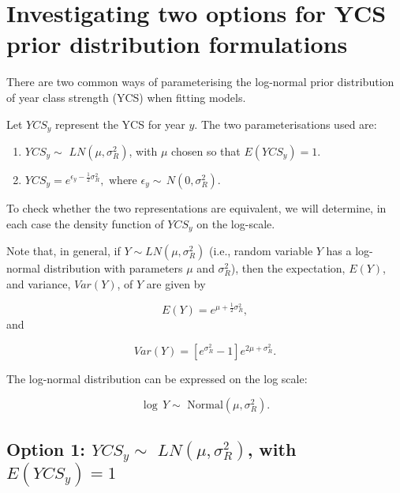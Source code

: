 \begin{appendices}\label{appendix}

\section{Investigating two options for YCS prior distribution
	formulations}\label{investigating-two-options-for-ycs-prior-distribution-formulations}

There are two common ways of parameterising the log-normal prior
distribution of year class strength (YCS) when fitting models.

Let \(YCS_y\) represent the YCS for year \(y\). The two
parameterisations used are:

\begin{enumerate}
	\def\labelenumi{\arabic{enumi}.}
	\item \(YCS_y \sim \,\, LN(\mu, \sigma^2_R)\), with \(\mu\) chosen
	so that \(E(YCS_y)=1\).
	\item \(YCS_y = e^{\epsilon_y - \frac{1}{2}\sigma^2_R},\,\, \text{where } \epsilon_y \sim \,N(0, \sigma^2_R)\).
\end{enumerate}

To check whether the two representations are equivalent, we will
determine, in each case the density function of \(YCS_y\) on the
log-scale.

Note that, in general, if \(Y \sim LN(\mu, \sigma^2_R)\) (i.e., random
variable \(Y\) has a log-normal distribution with parameters \(\mu\)
and \(\sigma^2_R\)), then the expectation, \(E(Y)\), and variance,
\(Var(Y)\), of \(Y\) are given by

\[E(Y) = e^{\mu + \frac{1}{2}\sigma^2_R},\] and

\[Var(Y) = \left[e^{\sigma^2_R}-1\right]e^{2\mu + \sigma^2_R}.\]

The log-normal distribution can be expressed on the log scale:

\[\log\, Y \sim \,\, \text{Normal}(\mu, \sigma^2_R).\]

\subsection*{\texorpdfstring{Option 1:
		\(YCS_y \sim \,\, LN(\mu, \sigma^2_R)\), with
		\(E(YCS_y)=1\)}{1.1 Option 1: YCS\_y \textbackslash{}sim \textbackslash{},\textbackslash{}, LN(\textbackslash{}mu, \textbackslash{}sigma\^{}2\_R), with E(YCS\_y)=1}}\label{option-1-ycs_y-sim-lnmu-sigma2_r-with-eycs_y1}


\end{appendices}
